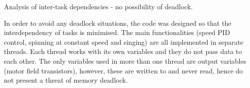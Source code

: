 \documentclass[main.tex]{subfiles}
\begin{document}
Analysis of inter-task dependencies - no possibility of deadlock.

In order to avoid any deadlock situations, the code was designed so that the interdependency of tasks is minimised. The main functionalities (speed PID control, spinning at constant speed and singing) are all implemented in separate threads. Each thread works with its own variables and they do not pass data to each other. The only variables used in more than one thread are output variables (motor field transistors), however, these are written to and never read, hence do not present a threat of memory deadlock.
\end{document}
